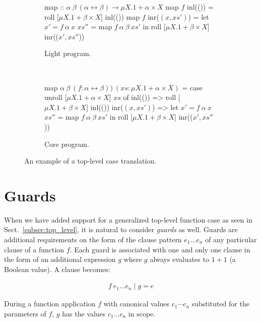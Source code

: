 \begin{figure}[ht!]
  \centering
  \begin{subfigure}[b]{0.90\textwidth}
    \begin{rfuncodenum}
map :: $\alpha~\beta~(\alpha \leftrightarrow \beta) \rightarrow \mu X . 1 + \alpha \times X$
map $f$ inl(()) = roll [$\mu X . 1 + \beta \times X$] inl(())
map $f$ inr($(x, xs')$) = let $x' = f~\alpha~x$
                           $xs''$ = map $f~\alpha~\beta~xs'$
                       in roll [$\mu X . 1 + \beta \times X$] inr(($x', xs''$))
    \end{rfuncodenum}
  \caption{Light program.}
  \end{subfigure}
  ~
  \begin{subfigure}[b]{0.90\textwidth}
    \begin{rfuncodenum}
map $\alpha~\beta~(f: \alpha \leftrightarrow \beta))~(xs: \mu X . 1 + \alpha \times X)$ = case unroll [$\mu X . 1 + \alpha \times X$] $xs$ of
  inl(()) => roll [$\mu X . 1 + \beta \times X$] inl(())
  inr($(x, xs')$) => let $x' = f~\alpha~x$
                       $xs''$ = map $f~\alpha~\beta~xs'$
                   in roll [$\mu X . 1 + \beta \times X$] inr(($x', xs''$))
    \end{rfuncodenum}
  \caption{Core program.}
  \end{subfigure}
\caption{An example of a top-level case translation.}\label{fig:top_level_translation}
\end{figure}

\section{Guards}

When we have added support for a generalized top-level function case as seen in
Sect.~\ref{subsec:top_level}, it is natural to consider \emph{guards} as well.
Guards are additional requirements on the form of the clause pattern $e_1 \dots
e_n$ of any particular clause of a function $f$. Each guard is associated with
one and only one clause in the form of an additional expression $g$ where $g$
always evaluates to $1 + 1$ (a Boolean value). A clause becomes:

\begin{align*}
f~e_1 \dots e_n \mid g = e
\end{align*}

During a function application $f$ with canonical values $c_1 \cdots c_n$
substituted for the parameters of $f$, $g$ has the values $c_1 \dots c_n$ in
scope.

